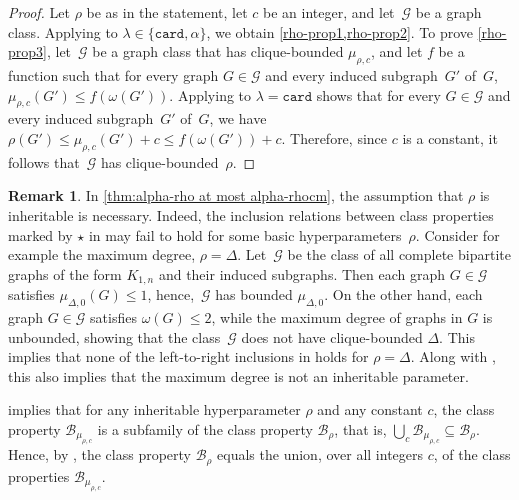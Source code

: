 \documentclass[11pt]{article}
\newcommand{\rhocm}{\mu_{\rho,c}}
\theoremstyle{plain}
\theoremstyle{definition}
\newtheorem{remark}[theorem]{Remark}
\theoremstyle{remark}
\numberwithin{equation}{section}
\begin{document}
\begin{proof}
    Let $\rho$ be as in the statement, let $c$ be an integer, and let~$\mathcal{G}$ be a graph class. 
    Applying  to $\lambda\in \{\mathtt{card},\alpha\}$, we obtain \cref{rho-prop1,rho-prop2}.
    To prove \cref{rho-prop3}, let~$\mathcal{G}$ be a graph class that has clique-bounded $\rhocm$, and let $f$ be a function such that for every graph $G\in \mathcal{G}$ and every induced subgraph~$G'$ of~$G$, $\rhocm(G') \le f(\omega(G'))$.
    Applying  to $\lambda = \mathtt{card}$ shows that for every $G\in \mathcal{G}$ and every induced subgraph~$G'$ of~$G$, we have $\rho(G')\le \rhocm(G') + c\le f(\omega(G')) + c$.
    Therefore, since $c$ is a constant, it follows that~$\mathcal{G}$ has clique-bounded~$\rho$.
\end{proof}

\begin{remark}\label{necessary inheritability}
In \cref{thm:alpha-rho at most alpha-rhocm}, the assumption that $\rho$ is inheritable is necessary.
Indeed, the inclusion relations between class properties marked by $\star$ in  may fail to hold for some basic hyperparameters~$\rho$.
Consider for example the maximum degree, $\rho = \Delta$.
Let~$\mathcal{G}$ be the class of all complete bipartite graphs of the form $K_{1,n}$ and their induced subgraphs.
Then each graph $G\in \mathcal{G}$ satisfies $\mu_{\Delta,0}(G) \le 1$, hence,~$\mathcal{G}$ has bounded $\mu_{\Delta,0}$.
On the other hand, each graph $G\in \mathcal{G}$ satisfies $\omega(G) \le 2$, while the maximum degree of graphs in $G$ is unbounded, showing that the class~$\mathcal{G}$ does not have clique-bounded $\Delta$.
This implies that none of the left-to-right inclusions in  holds for $\rho = \Delta$.
Along with , this also implies that the maximum degree is not an inheritable parameter.
\end{remark}

 implies that for any inheritable hyperparameter $\rho$ and any constant $c$, the class property $\mathcal{B}_{\rhocm}$ is a subfamily of the class property $\mathcal{B}_{\rho}$, that is, $\bigcup_{c}\mathcal{B}_{\rhocm} \subseteq \mathcal{B}_{\rho}$.
Hence, by , the class property $\mathcal{B}_{\rho}$ equals the union, over all integers $c$, of the class properties $\mathcal{B}_{\rhocm}$.
\end{document}
